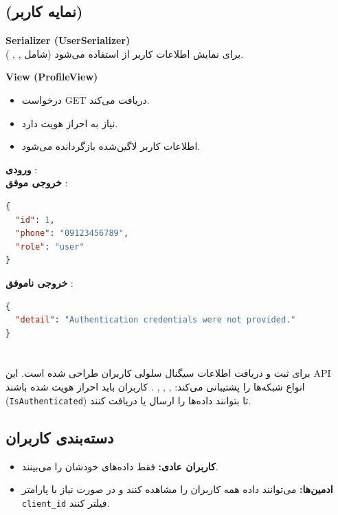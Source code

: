 \documentclass{report}
\begin{document}
\subsection{ (نمایه کاربر)}
\textbf{Serializer (UserSerializer)} \\
برای نمایش اطلاعات کاربر از  استفاده می‌شود (شامل , , ).

\textbf{View (ProfileView)} \\
\begin{itemize}
  \item درخواست GET دریافت می‌کند.
  \item نیاز به احراز هویت دارد.
  \item اطلاعات کاربر لاگین‌شده بازگردانده می‌شود.
\end{itemize}

\textbf{ورودی }:   \\

\textbf{خروجی موفق }:
\begin{lstlisting}[language=json]
{
  "id": 1,
  "phone": "09123456789",
  "role": "user"
}
\end{lstlisting}

\textbf{خروجی ناموفق }:
\begin{lstlisting}[language=json]
{
  "detail": "Authentication credentials were not provided."
}
\end{lstlisting}

\section{}
برای ثبت و دریافت اطلاعات سیگنال سلولی کاربران طراحی شده است. این API انواع شبکه‌ها را پشتیبانی می‌کند: , , , . کاربران باید احراز هویت شده باشند (\texttt{IsAuthenticated}) تا بتوانند داده‌ها را ارسال یا دریافت کنند.

\subsection{دسته‌بندی کاربران}
\begin{itemize}
    \item \textbf{کاربران عادی:} فقط داده‌های خودشان را می‌بینند.
    \item \textbf{ادمین‌ها:} می‌توانند داده همه کاربران را مشاهده کنند و در صورت نیاز با پارامتر \texttt{client\_id} فیلتر کنند.
\end{itemize}
\end{document}
